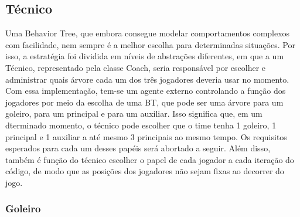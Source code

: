 \documentclass[a4paper,12pt]{article}
\begin{document}
\subsection{Técnico}

Uma Behavior Tree, que embora consegue modelar comportamentos complexos com facilidade, nem sempre é a melhor escolha para determinadas situações. Por isso, a estratégia foi dividida em níveis de abstrações diferentes, em que a um Técnico, representado pela classe Coach, seria responsável por escolher e administrar quais árvore cada um dos três jogadores deveria usar no momento.
Com essa implementação, tem-se um agente externo controlando a função dos jogadores por meio da escolha de uma BT, que pode ser uma árvore para um goleiro, para um principal e para um auxiliar. Isso significa que, em um dterminado momento, o técnico pode escolher que o time tenha 1 goleiro, 1 principal e 1 auxiliar a até mesmo 3 principais ao mesmo tempo. Os requisitos esperados para cada um desses papéis será abortado a seguir. Além disso, também é função do técnico escolher o papel de cada jogador a cada iteração do código, de modo que as posições dos jogadores não sejam fixas ao decorrer do jogo.

\subsubsection{Goleiro} 
\end{document}
